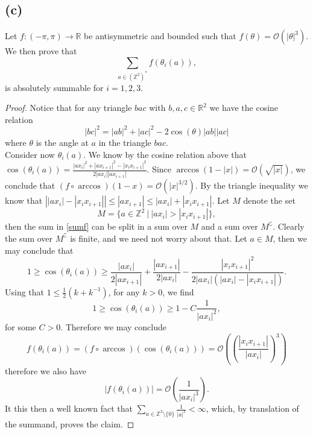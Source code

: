\documentclass[a4paper,11pt]{article}
\newcommand{\abs}[1]{\left\lvert #1 \right\rvert}
\newcommand{\R}{\mathbb{R}}
\newcommand{\Z}{\mathbb{Z}}
\numberwithin{equation}{section}
\begin{document}
	\subsection*{(c)}
	Let $ f:(-\pi,\pi)\to\R $ be antisymmetric and bounded such that $ f(\theta)=\mathcal{O}(\abs{\theta}^3) $. We then prove that \begin{equation}
	\sum_{a\in(\Z^2)^*}f(\theta_i(a)),\label{sumf}
	\end{equation}
	is absolutely summable for $ i=1,2,3 $. \begin{proof}
		Notice that for any triangle $ bac $ with $ b,a,c\in\R^2 $ we have the cosine relation\begin{equation}
		\abs{bc}^2=\abs{ab}^2+\abs{ac}^2-2\cos(\theta)\abs{ab}\abs{ac}
		\end{equation}
	where $ \theta $ is the angle at $ a $ in the triangle $ bac $. \\
	Consider now $ \theta_i(a) $. We know by the cosine relation above that $ \cos(\theta_i(a))=\frac{\abs{ax_i}^2+\abs{ax_{i+1}}^2-\abs{x_ix_{i+1}}^2}{2\abs{ax_i}\abs{ax_{i+1}}} $. Since $ \arccos(1-\abs{x})=\mathcal{O}(\sqrt{\abs{x}}) $, we conclude that $ (f\circ\arccos)(1-x)=\mathcal{O}(\abs{x}^{3/2}) $. By the triangle inequality we know that $ \abs{\abs{ax_i}-\abs{x_ix_{i+1}}}\leq\abs{ax_{i+1}}\leq\abs{ax_i}+\abs{x_ix_{i+1}} $. Let $ M $ denote the set \begin{equation}
	M=\{a\in\Z^2\ \vert\ \abs{ax_i}>\abs{x_ix_{i+1}}\},
	\end{equation} then the sum in \eqref{sumf} can be split in a sum over $ M $ and a sum over $ M^\complement $. Clearly the sum over $ M^\complement $ is finite, and we need not worry about that. Let $ a\in M $, then we may conclude that \begin{equation}
	1\geq\cos(\theta_i(a))\geq\frac{\abs{ax_i}}{2\abs{ax_{i+1}}}+\frac{\abs{ax_{i+1}}}{2\abs{ax_i}}-\frac{\abs{x_ix_{i+1}}^2}{2\abs{ax_i}(\abs{ax_i}-\abs{x_ix_{i+1}})}.
	\end{equation}
	Using that $ 1\leq\frac{1}{2}\left(k+k^{-1}\right) $, for any $k>0$,
	 we find \begin{equation}
	1\geq\cos(\theta_i(a))\geq1-C\frac{1}{\abs{ax_i}^2},
	\end{equation}
	for some $ C>0 $. Therefore we may conclude\begin{equation}
	f(\theta_i(a))=(f\circ\arccos)(\cos(\theta_i(a)))=\mathcal{O}\left(\left(\frac{\abs{x_ix_{i+1}}}{\abs{ax_i}}\right)^3\right)
	\end{equation}
	therefore we also have \begin{equation}
	\abs{f(\theta_i(a))}=\mathcal{O}\left(\frac{1}{\abs{ax_i}^3}\right).
	\end{equation}
	It this then a well known fact that $ \sum_{a\in\Z^2\setminus\{0\}}\frac{1}{\abs{a}^3}<\infty $, which, by translation of the summand, proves the claim.
\end{proof}
\end{document}

